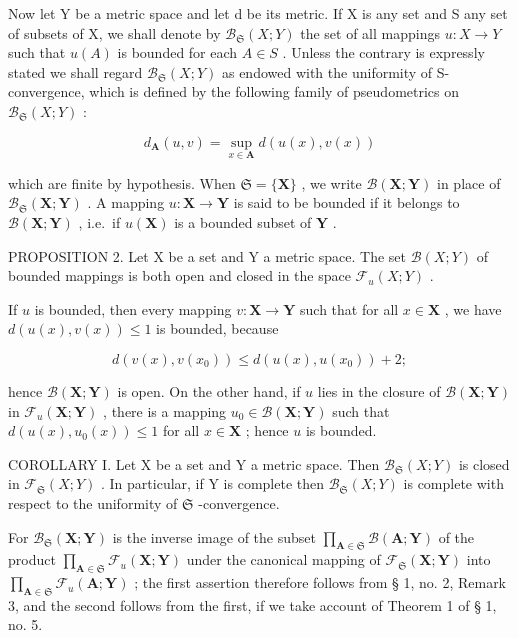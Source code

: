 Now let Y be a metric space and let d be its metric. If X is any set and S any set of subsets of X, we shall denote by \(\mathcal{B}_{\mathfrak{S}}(X;Y)\) the set of all mappings \(u:X\to Y\) such that \(u(A)\) is bounded for each \(A\in S\) . Unless the contrary is expressly stated we shall regard \(\mathcal{B}_{\mathfrak{S}}(X;Y)\) as endowed with the uniformity of S-convergence, which is defined by the following family of pseudometrics on \(\mathcal{B}_{\mathfrak{S}}(X;Y)\) :

\[
d _ {\mathbf {A}} (u, v) = \sup _ {x \in \mathbf {A}} d (u (x), v (x))\tag{A ∈ S}
\]

which are finite by hypothesis. When \(\mathfrak{S} = \{\mathbf{X}\}\) , we write \(\mathcal{B}(\mathbf{X};\mathbf{Y})\) in place of \(\mathcal{B}_{\mathfrak{S}}(\mathbf{X};\mathbf{Y})\) . A mapping \(u:\mathbf{X}\to \mathbf{Y}\) is said to be bounded if it belongs to \(\mathcal{B}(\mathbf{X};\mathbf{Y})\) , i.e.~if \(u(\mathbf{X})\) is a bounded subset of \(\mathbf{Y}\) .

PROPOSITION 2. Let X be a set and Y a metric space. The set \(\mathcal{B}(X;Y)\) of bounded mappings is both open and closed in the space \(\mathcal{F}_{u}(X;Y)\) .

If \(u\) is bounded, then every mapping \(v: \mathbf{X} \to \mathbf{Y}\) such that for all \(x \in \mathbf{X}\) , we have \(d(u(x), v(x)) \leqslant 1\) is bounded, because

\[
d (v (x), v (x _ {0})) \leqslant d (u (x), u (x _ {0})) + 2;
\]

hence \(\mathcal{B}(\mathbf{X};\mathbf{Y})\) is open. On the other hand, if \(u\) lies in the closure of \(\mathcal{B}(\mathbf{X};\mathbf{Y})\) in \(\mathcal{F}_u(\mathbf{X};\mathbf{Y})\) , there is a mapping \(u_0\in \mathcal{B}(\mathbf{X};\mathbf{Y})\) such that \(d(u(x),u_0(x))\leqslant 1\) for all \(x\in \mathbf{X}\) ; hence \(u\) is bounded.

COROLLARY I. Let X be a set and Y a metric space. Then \(\mathcal{B}_{\mathfrak{S}}(X;Y)\) is closed in \(\mathcal{F}_{\mathfrak{S}}(X;Y)\) . In particular, if Y is complete then \(\mathcal{B}_{\mathfrak{S}}(X;Y)\) is complete with respect to the uniformity of \(\mathfrak{S}\) -convergence.

For \(\mathcal{B}_{\mathfrak{S}}(\mathbf{X};\mathbf{Y})\) is the inverse image of the subset \(\prod_{\mathbf{A}\in \mathfrak{S}}\mathcal{B}(\mathbf{A};\mathbf{Y})\) of the product \(\prod_{\mathbf{A}\in \mathfrak{S}}\mathcal{F}_u(\mathbf{X};\mathbf{Y})\) under the canonical mapping of \(\mathcal{F}_{\mathfrak{S}}(\mathbf{X};\mathbf{Y})\) into \(\prod_{\mathbf{A}\in \mathfrak{S}}\mathcal{F}_u(\mathbf{A};\mathbf{Y})\) ; the first assertion therefore follows from § 1, no. 2, Remark 3, and the second follows from the first, if we take account of Theorem 1 of § 1, no. 5.

